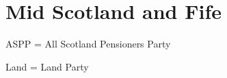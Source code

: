 \vfill

\section{Mid Scotland and Fife}

ASPP = All Scotland Pensioners Party




Land = Land Party

%



